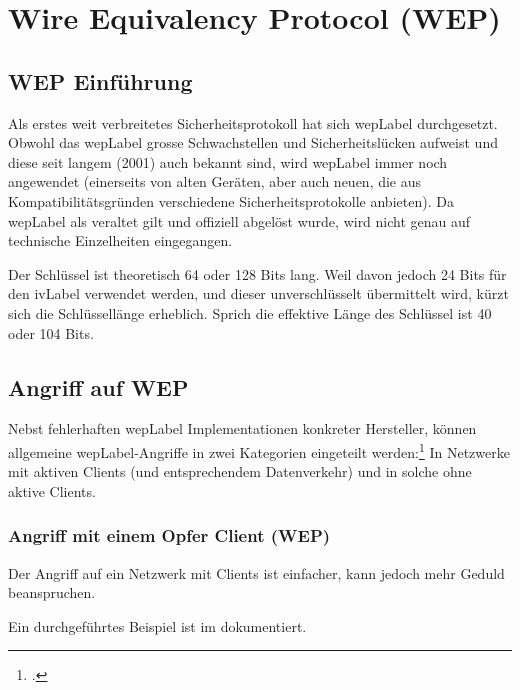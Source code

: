 \chapter{Wire Equivalency Protocol (WEP)}
\label{ch:wep}

\section{WEP Einführung}
Als erstes weit verbreitetes Sicherheitsprotokoll hat sich \acrfull{wepLabel} durchgesetzt.
Obwohl das \gls{wepLabel} grosse Schwachstellen und Sicherheitslücken aufweist und diese seit langem (2001) auch bekannt sind, wird \gls{wepLabel} immer noch angewendet (einerseits von alten Geräten, aber auch neuen, die aus Kompatibilitätsgründen verschiedene Sicherheitsprotokolle anbieten).
Da \gls{wepLabel} als veraltet gilt und offiziell abgelöst wurde, wird nicht genau auf technische Einzelheiten eingegangen.

Der Schlüssel ist theoretisch 64 oder 128 Bits lang.
Weil davon jedoch 24 Bits für den \gls{ivLabel} verwendet werden, und dieser unverschlüsselt übermittelt wird, kürzt sich die Schlüssellänge erheblich.
Sprich die effektive Länge des Schlüssel ist 40 oder 104 Bits.

\section{Angriff auf WEP}
Nebst fehlerhaften \gls{wepLabel} Implementationen konkreter Hersteller, können allgemeine \gls{wepLabel}-Angriffe in zwei Kategorien eingeteilt werden:\footcite[][126ff.]{WrightCache201503}
In Netzwerke mit aktiven Clients (und entsprechendem Datenverkehr) und in solche ohne aktive Clients.

\subsection{Angriff mit einem Opfer Client (WEP)}
Der Angriff auf ein Netzwerk mit Clients ist einfacher, kann jedoch mehr Geduld beanspruchen.

Ein durchgeführtes Beispiel ist im  dokumentiert.


